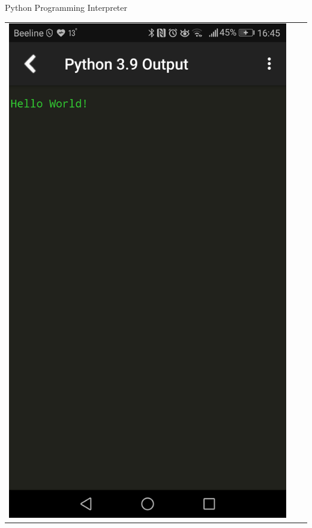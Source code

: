 \documentclass[12pt]{beamer}
\begin{document}
\begin{frame}{Python Programming Interpreter}
\begin{center}
\begin{tabular}{ccc}
		\includegraphics[scale=0.083]{image/interpreter_03.PNG} \\ 
	\end{tabular} \\
	\vspace{0.5cm}
	\href{https://play.google.com/store/apps/details?id=com.krazeapps.pythonprogrammingcompiler}{}
\end{center}
\end{frame}
\end{document}
